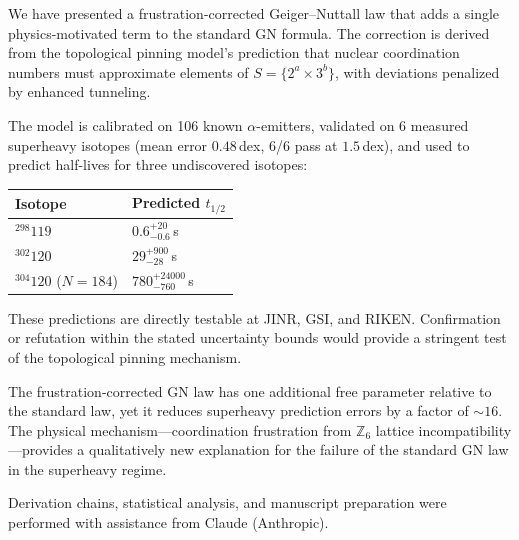 \documentclass[12pt,a4paper,twocolumn]{revtex4-2}
\newcommand{\thalf}{t_{1/2}}
\begin{document}
We have presented a frustration-corrected Geiger--Nuttall law
that adds a single physics-motivated term to the standard GN
formula.  The correction is derived from the topological pinning
model's prediction that nuclear coordination numbers must
approximate elements of $S = \{2^a \times 3^b\}$, with
deviations penalized by enhanced tunneling.

The model is calibrated on 106 known $\alpha$-emitters,
validated on 6 measured superheavy isotopes (mean error
$0.48$\,dex, 6/6 pass at $1.5$\,dex), and used to predict
half-lives for three undiscovered isotopes:

\begin{center}
\begin{tabular}{@{}ll@{}}
\toprule
Isotope & Predicted $\thalf$ \\
\midrule
${}^{298}119$ & $0.6^{+20}_{-0.6}$\,s \\
${}^{302}120$ & $29^{+900}_{-28}$\,s \\
${}^{304}120$ ($N=184$) & $780^{+24000}_{-760}$\,s \\
\bottomrule
\end{tabular}
\end{center}

These predictions are directly testable at JINR, GSI, and
RIKEN.  Confirmation or refutation within the stated
uncertainty bounds would provide a stringent test of the
topological pinning mechanism.

The frustration-corrected GN law has one additional free
parameter relative to the standard law, yet it reduces
superheavy prediction errors by a factor of $\sim 16$.
The physical mechanism---coordination frustration from
$\mathbb{Z}_6$ lattice incompatibility---provides a
qualitatively new explanation for the failure of the
standard GN law in the superheavy regime.

\begin{acknowledgments}
Derivation chains, statistical analysis, and manuscript
preparation were performed with assistance from Claude
(Anthropic).
\end{acknowledgments}
\end{document}
